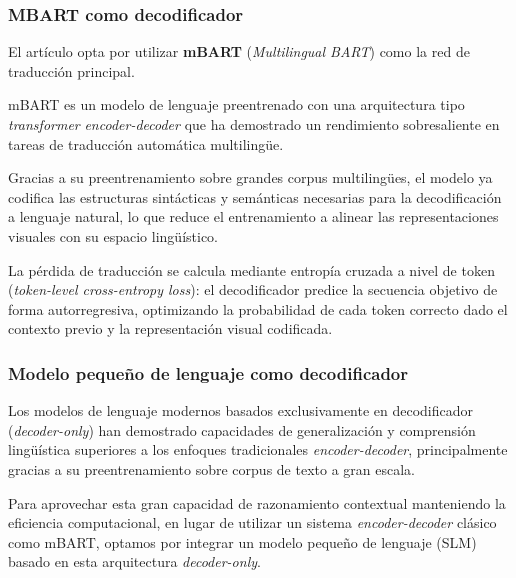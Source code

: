 \subsubsection{MBART como decodificador}
El artículo opta por utilizar \textbf{mBART} (\textit{Multilingual BART}) \cite{mBART} como la red de traducción principal.

mBART es un modelo de lenguaje preentrenado con una arquitectura tipo \textit{transformer} \textit{encoder-decoder} que ha demostrado un rendimiento sobresaliente en tareas de traducción automática multilingüe.

Gracias a su preentrenamiento sobre grandes corpus multilingües, el modelo ya codifica las estructuras sintácticas y semánticas necesarias para la decodificación a lenguaje natural, lo que reduce el entrenamiento a alinear las representaciones visuales con su espacio lingüístico.

La pérdida de traducción se calcula mediante entropía cruzada a nivel de token (\textit{token-level cross-entropy loss}): el decodificador predice la secuencia objetivo de forma autorregresiva, optimizando la probabilidad de cada token correcto dado el contexto previo y la representación visual codificada.

\subsubsection{Modelo pequeño de lenguaje como decodificador}
Los modelos de lenguaje modernos basados exclusivamente en decodificador (\textit{decoder-only}) han demostrado capacidades de generalización y comprensión lingüística superiores a los enfoques tradicionales \textit{encoder-decoder}, principalmente gracias a su preentrenamiento sobre corpus de texto a gran escala.

Para aprovechar esta gran capacidad de razonamiento contextual manteniendo la eficiencia computacional, en lugar de utilizar un sistema \textit{encoder-decoder} clásico como mBART, optamos por integrar un modelo pequeño de lenguaje (SLM) basado en esta arquitectura \textit{decoder-only}.


